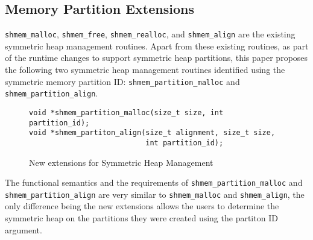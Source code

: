 \subsection{Memory Partition Extensions}
\label{src:smempart/extensions}
\texttt{shmem\_malloc}, \texttt{shmem\_free}, \texttt{shmem\_realloc},
and \texttt{shmem\_align} are the existing symmetric heap management
routines. Apart from these existing routines, as part of the runtime
changes to support symmetric heap partitions, this paper proposes the
following two symmetric heap management routines identified using the
symmetric memory partition ID: \texttt{shmem\_partition\_malloc} and
\texttt{shmem\_partition\_align}.

\begin{figure}
    \lstset{language=c,
            keywordstyle=\bfseries,
            basicstyle=\tt\small,
            frame=single}
    \begin{lstlisting}
void *shmem_partition_malloc(size_t size, int partition_id);
void *shmem_partiton_align(size_t alignment, size_t size,
                           int partition_id);
    \end{lstlisting}
    \caption{New extensions for Symmetric Heap Management}
    \label{fig:extensions}
\end{figure}

The functional semantics and the requirements of
\texttt{shmem\_partition\_malloc} and \texttt{shmem\_partition\_align}
are very similar to \texttt{shmem\_malloc} and \texttt{shmem\_align},
the only difference being the new extensions allows the users to
determine the symmetric heap on the partitions they were created using
the partiton ID argument.
